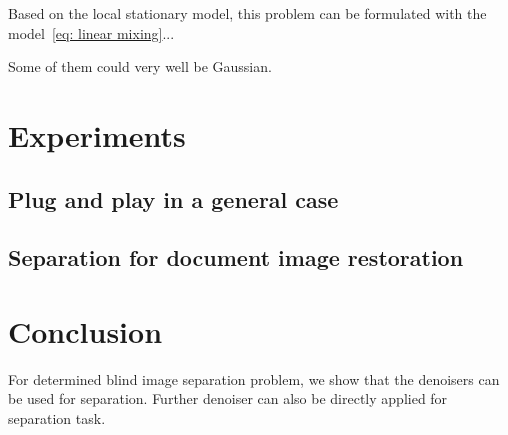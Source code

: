 \documentclass[conference]{IEEEtran}
\theoremstyle{plain}
\begin{document}
Based on the local stationary model, this problem can be formulated with the model~\eqref{eq: linear mixing}... 

Some of them could very well be Gaussian.
 


\section{Experiments}
\label{sec: xp}


\subsection{Plug and play in a general case}

 
 
\subsection{Separation for document image restoration}



\section{Conclusion}
\label{sec: conclusion}
For determined blind image separation problem, we show that the denoisers can be used for separation. Further denoiser can also be directly applied for separation task.



\end{document}
